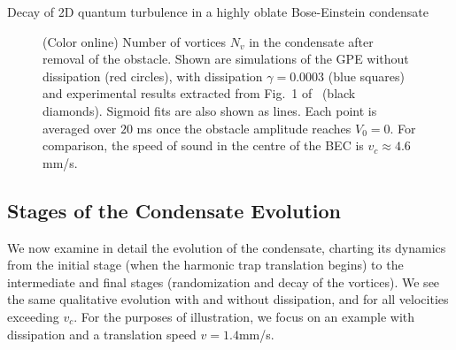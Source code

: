 \begin{chapter}{\label{cha:shin}Decay of 2D quantum turbulence in a highly oblate Bose-Einstein condensate}
\begin{figure}[!ht]
\begin{center}
\end{center}
\caption{\label{fig:N_vV} (Color online) Number of vortices $N_v$ in the condensate after removal of the obstacle. Shown are simulations of the GPE without dissipation (red circles), with dissipation $\gamma = 0.0003$ (blue squares) and experimental results extracted from Fig.~1 of~\citep{kwon_moon_14} (black diamonds). Sigmoid fits are also shown as lines. Each point is averaged over $20$ ms once the obstacle amplitude reaches $V_0=0$.  For comparison, the speed of sound in the centre of the BEC is $v_c\approx 4.6$ mm/s.  }
\end{figure} 

\subsection{Stages of the Condensate Evolution}

We now examine in detail the evolution of the condensate, 
charting its dynamics from the initial stage (when the
harmonic trap translation begins) to the intermediate and final stages 
(randomization and decay of the vortices).  We see the same 
qualitative evolution with and without dissipation, and for all 
velocities exceeding $v_c$.  For the purposes of illustration, 
we focus on an example with dissipation and a translation 
speed $v=1.4$mm/s. 



\end{chapter}
